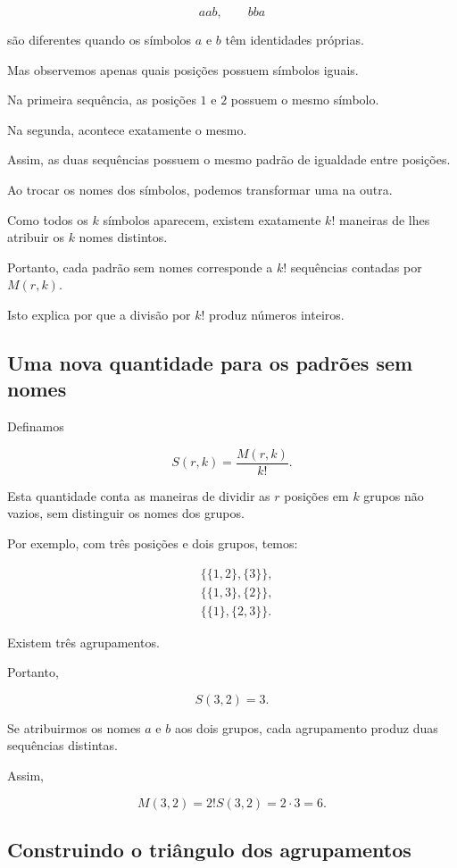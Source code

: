 \documentclass[11pt,a4paper,oneside]{book}
\begin{document}
\[
aab,\qquad bba
\]

são diferentes quando os símbolos
$a$ e $b$ têm identidades próprias.

Mas observemos apenas quais posições
possuem símbolos iguais.

Na primeira sequência, as posições
$1$ e $2$ possuem o mesmo símbolo.

Na segunda, acontece exatamente o mesmo.

Assim, as duas sequências possuem
o mesmo padrão de igualdade entre posições.

Ao trocar os nomes dos símbolos,
podemos transformar uma na outra.

Como todos os $k$ símbolos aparecem,
existem exatamente $k!$ maneiras
de lhes atribuir os $k$ nomes distintos.

Portanto, cada padrão sem nomes
corresponde a $k!$ sequências
contadas por $M(r,k)$.

Isto explica por que a divisão
por $k!$ produz números inteiros.

\subsection*{Uma nova quantidade para os padrões sem nomes}

Definamos

\[
\boxed{
S(r,k)=\frac{M(r,k)}{k!}
}.
\]

Esta quantidade conta as maneiras
de dividir as $r$ posições
em $k$ grupos não vazios,
sem distinguir os nomes dos grupos.

Por exemplo, com três posições
e dois grupos, temos:

\[
\begin{aligned}
&\{\{1,2\},\{3\}\},\\
&\{\{1,3\},\{2\}\},\\
&\{\{1\},\{2,3\}\}.
\end{aligned}
\]

Existem três agrupamentos.

Portanto,

\[
S(3,2)=3.
\]

Se atribuirmos os nomes $a$ e $b$
aos dois grupos, cada agrupamento
produz duas sequências distintas.

Assim,

\[
M(3,2)=2!S(3,2)=2\cdot3=6.
\]

\subsection*{Construindo o triângulo dos agrupamentos}
\end{document}
